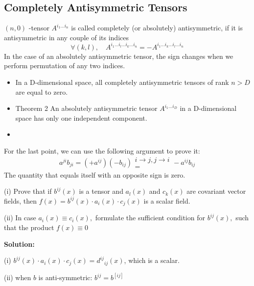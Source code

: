 \subsection{Completely Antisymmetric Tensors}
$(n, 0)$ -tensor $A^{i_{1} \ldots i_{n}}$ is called completely (or absolutely) antisymmetric, if it is antisymmetric in any couple of its indices
\[
\forall(k, l), \quad A^{i_{1} \ldots i_{l} \ldots i_{k} \ldots i_{n}}=-A^{i_{1} \ldots i_{k} \ldots i_{l} \ldots i_{n}}
\]
In the case of an absolutely antisymmetric tensor, the sign changes when we perform permutation of any two indices.
\begin{qt}
\begin{itemize}
    \item In a D-dimensional space, all completely antisymmetric tensors of rank $n>D$ are equal to zero.

    \item Theorem 2 An absolutely antisymmetric tensor $A^{i_{1} \ldots i_{D}}$ in a D-dimensional space has only one independent component.
    
    \item {}
\end{itemize}
\end{qt}
For the last point, we can use the following argument to prove it:
$$
a^{j i} b_{j i}=\left(+a^{i j}\right)\left(-b_{i j}\right)\substack{i\rightarrow j,j\rightarrow i\\=}-a^{i j} b_{i j}
$$
The quantity that equals itself with an opposite sign is zero.
\begin{example}
(i) Prove that if $b^{i j}(x)$ is a tensor and $a_{l}(x)$ and $c_{k}(x)$ are covariant vector fields, then $f(x)=b^{i j}(x) \cdot a_{i}(x) \cdot c_{j}(x)$ is a scalar field.

(ii) In case $a_{i}(x) \equiv c_{i}(x),$ formulate the sufficient condition for $b^{i j}(x),$ such that the product $f(x) \equiv 0$
\end{example}
\textbf{Solution:}

(i) $b^{i j}(x) \cdot a_{i}(x) \cdot c_{j}(x)=d^{ij}{}_{ij}(x)$, which is a scalar.

(ii) when $b$ is anti-symmetric: $b^{i j}=b^{[i j]}$

